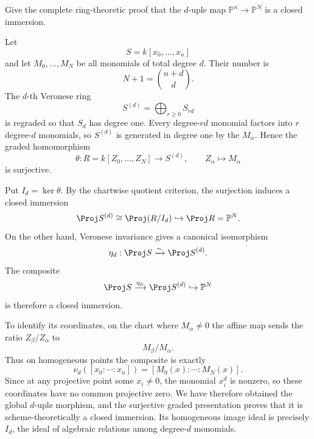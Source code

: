 \begin{problem}\label{prob:vi38-07}
Give the complete ring-theoretic proof that the \(d\)-uple map \(\mathbb P^n\to\mathbb P^N\) is a closed immersion.
\end{problem}

\ifdefined\FullProblemDossiers
\begin{solution}
Let
\[
S=k[x_0,\ldots,x_n]
\]
and let \(M_0,\ldots,M_N\) be all monomials of total degree \(d\). Their number is
\[
N+1=\binom{n+d}{d}.
\]
The \(d\)-th Veronese ring
\[
S^{(d)}=\bigoplus_{r\ge0}S_{rd}
\]
is regraded so that \(S_d\) has degree one. Every degree-\(rd\) monomial factors
into \(r\) degree-\(d\) monomials, so \(S^{(d)}\) is generated in degree one by the
\(M_\alpha\). Hence the graded homomorphism
\[
\theta:R=k[Z_0,\ldots,Z_N]\longrightarrow S^{(d)},
\qquad Z_\alpha\longmapsto M_\alpha
\]
is surjective.

Put \(I_d=\ker\theta\).  By the chartwise quotient criterion, the surjection induces
a closed immersion
\[
\Proj S^{(d)}\cong\Proj(R/I_d)\hookrightarrow\Proj R=\mathbb P^N.
\]
On the other hand, Veronese invariance gives a canonical isomorphism
\[
\eta_d:\Proj S\xrightarrow{\sim}\Proj S^{(d)}.
\]
The composite
\[
\Proj S\xrightarrow{\eta_d}\Proj S^{(d)}\hookrightarrow\mathbb P^N
\]
is therefore a closed immersion.

To identify its coordinates, on the chart where \(M_\alpha\neq0\) the affine map
sends the ratio \(Z_\beta/Z_\alpha\) to
\[
M_\beta/M_\alpha.
\]
Thus on homogeneous points the composite is exactly
\[
\boxed{\nu_d([x_0:\cdots:x_n])
=[M_0(x):\cdots:M_N(x)]}.
\]
Since at any projective point some \(x_i\neq0\), the monomial \(x_i^d\) is nonzero,
so these coordinates have no common projective zero.  We have therefore obtained
the global \(d\)-uple morphism, and the surjective graded presentation proves that
it is scheme-theoretically a closed immersion.  Its homogeneous image ideal is
precisely \(I_d\), the ideal of algebraic relations among degree-\(d\) monomials.
\end{solution}
\fi
